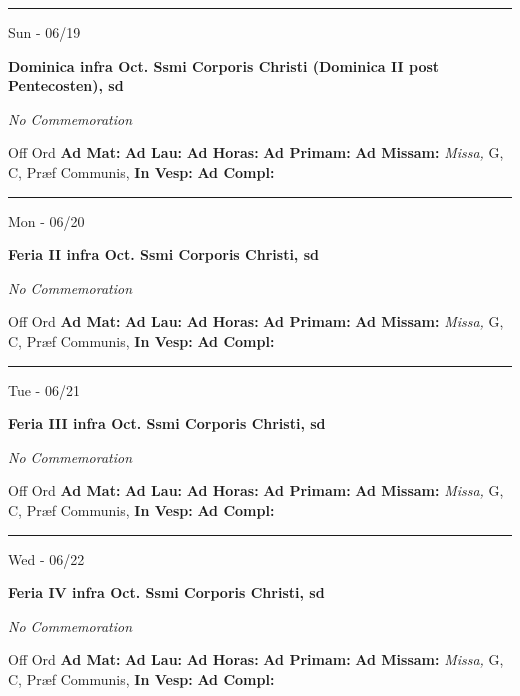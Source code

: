 \documentclass[letterpaper, 10pt]{article}
\begin{document}
\hrule
\begin{center}
Sun - 06/19
\end{center}\textbf{ \large Dominica infra Oct. Ssmi Corporis Christi (Dominica II post Pentecosten), \textnormal{\normalsize sd}}

\textit{No Commemoration}\begin{justify}
Off Ord
\textbf{Ad Mat: }
\textbf{Ad Lau: }
\textbf{Ad Horas: }
\textbf{Ad Primam: }
\textbf{Ad Missam:} \textit{Missa, } G, C, Præf Communis, 
\textbf{In Vesp: }
\textbf{Ad Compl: }\end{justify}



\hrule
\begin{center}
Mon - 06/20
\end{center}\textbf{ \large Feria II infra Oct. Ssmi Corporis Christi, \textnormal{\normalsize sd}}

\textit{No Commemoration}\begin{justify}
Off Ord
\textbf{Ad Mat: }
\textbf{Ad Lau: }
\textbf{Ad Horas: }
\textbf{Ad Primam: }
\textbf{Ad Missam:} \textit{Missa, } G, C, Præf Communis, 
\textbf{In Vesp: }
\textbf{Ad Compl: }\end{justify}



\hrule
\begin{center}
Tue - 06/21
\end{center}\textbf{ \large Feria III infra Oct. Ssmi Corporis Christi, \textnormal{\normalsize sd}}

\textit{No Commemoration}\begin{justify}
Off Ord
\textbf{Ad Mat: }
\textbf{Ad Lau: }
\textbf{Ad Horas: }
\textbf{Ad Primam: }
\textbf{Ad Missam:} \textit{Missa, } G, C, Præf Communis, 
\textbf{In Vesp: }
\textbf{Ad Compl: }\end{justify}



\hrule
\begin{center}
Wed - 06/22
\end{center}\textbf{ \large Feria IV infra Oct. Ssmi Corporis Christi, \textnormal{\normalsize sd}}

\textit{No Commemoration}\begin{justify}
Off Ord
\textbf{Ad Mat: }
\textbf{Ad Lau: }
\textbf{Ad Horas: }
\textbf{Ad Primam: }
\textbf{Ad Missam:} \textit{Missa, } G, C, Præf Communis, 
\textbf{In Vesp: }
\textbf{Ad Compl: }\end{justify}
\end{document}
